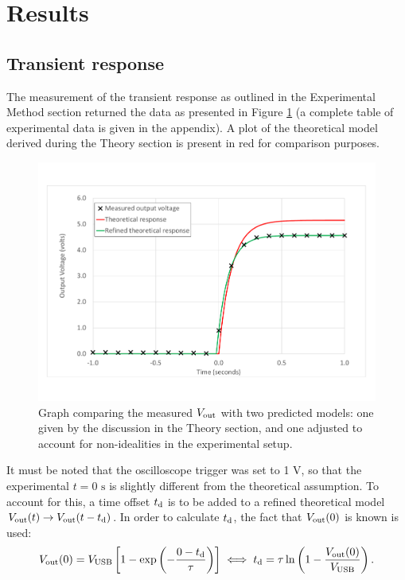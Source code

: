 \documentclass{article}
\begin{document}
\section{Results}
\subsection{Transient response}
The measurement of the transient response as outlined in the Experimental Method section returned the data as presented in Figure \ref{fig:transient_graph} (a complete table of experimental data is given in the appendix). A plot of the theoretical model derived during the Theory section is present in red for comparison purposes.
\begin{figure}[!htb]
    \centering
    \includegraphics[width = \linewidth]{transient_graph.pdf}
    \caption{Graph comparing the measured $V_{\text{out}}$ with two predicted models: one given by the discussion in the Theory section, and one adjusted to account for non-idealities in the experimental setup.}
    \label{fig:transient_graph}
\end{figure}
It must be noted that the oscilloscope trigger was set to 1 V, so that the experimental $t = 0\text{ s}$ is slightly different from the theoretical assumption. To account for this, a time offset $t_\text{d}$ is to be added to a refined theoretical model $V_{\text{out}}(t) \to V_{\text{out}}(t - t_\text{d})$. In order to calculate $t_\text{d}$, the fact that $V_{\text{out}}(0)$ is known is used:
\begin{equation}
    V_{\text{out}}(0) = V_{\text{USB}} \left[1 - \exp\left(-\frac{0-t_\text{d}}{\tau}\right)\right] \iff t_\text{d} = \tau\ln\left(1-\frac{V_{\text{out}}(0)}{V_{\text{USB}}}\right).
    \label{eqn:td}
\end{equation}
\end{document}
